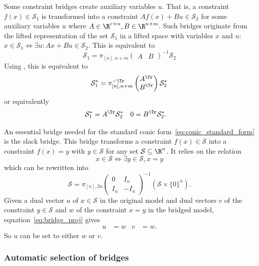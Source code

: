 \documentclass[11pt,twoside,a4paper,openright]{uclouvain-thesis}
\begin{document}
Some constraint bridges create auxiliary variables $u$.
That is, a constraint $f(x) \in \mathcal{S}_1$ is transformed into
a constraint $Af(x) + Bu \in \mathcal{S}_2$ for some auxiliary variables $u$ where $A \in \R^{r \times n}, B \in \R^{n \times m}$.
Such bridges originate from the lifted representation of the set $\mathcal{S}_1$ in a lifted space with variables $x$ and $u$:
$x \in \mathcal{S}_1 \Leftrightarrow \exists u: Ax + Bu \in \mathcal{S}_2$.
This is equivalent to
\[
  \mathcal{S}_1 =
  \pi_{[n], n + m}
  \begin{pmatrix}
    A & B
  \end{pmatrix}^{-1}
  \mathcal{S}_2
\]
Using , this is equivalent to
\[
  \mathcal{S}_1^* =
  \pi_{[n], n + m}^{-\Tr}
  \begin{pmatrix}
    A^\Tr \\ B^\Tr
  \end{pmatrix}
  \mathcal{S}_2^*
\]
or equivalently
\begin{align}
  \label{eq:bridge_proj}
  \mathcal{S}_1^* & = A^\Tr \mathcal{S}_2^* & 0 & = B^\Tr \mathcal{S}_2^*.
\end{align}

\begin{myexem}
  \label{exem:slack}
  An essential bridge needed for the standard conic form~\eqref{eq:conic_standard_form} is the slack bridge.
  This bridge transforms a constraint $f(x) \in \mathcal{S}$
  into a constraint $f(x) = y$ with $y \in \mathcal{S}$ for any set $\mathcal{S} \subseteq \R^n$.
  It relies on the relation
  \[
    x \in \mathcal{S} \Leftrightarrow
    \exists y \in \mathcal{S}, x = y
  \]
  which can be rewritten into
  \[
    \mathcal{S} =
    \pi_{[n], 2n}
    \begin{pmatrix}
      0 & I_n\\
      I_n & -I_n
    \end{pmatrix}^{-1}
    (\mathcal{S} \times \{0\}^n).
  \]
  Given a dual vector $u$ of $x \in \mathcal{S}$ in the original model and
  dual vectors
  $v$ of the constraint $y \in \mathcal{S}$
  and $w$ of the constraint $x = y$ in the bridged model,
  equation~\eqref{eq:bridge_proj} gives
  \begin{align*}
    u & = w & v & = w.
  \end{align*}
  So $u$ can be set to either $w$ or $v$.
\end{myexem}

\subsubsection{Automatic selection of bridges}
\label{sec:bridge_sec}
\end{document}
